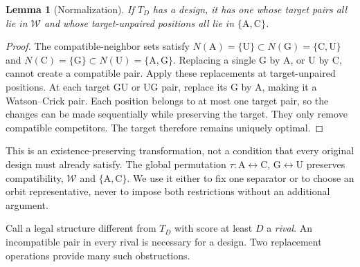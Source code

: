 \documentclass[11pt,a4paper]{article}
\newtheorem{lemma}[theorem]{Lemma}
\theoremstyle{definition}
\newcommand{\AC}{\{\mathrm A,\mathrm C\}}
\newcommand{\WC}{\mathcal W}
\begin{document}
\begin{lemma}[Normalization]\label{lem:normal}
If $T_D$ has a design, it has one whose target pairs all lie in $\WC$
and whose target-unpaired positions all lie in $\AC$.
\end{lemma}
\begin{proof}
The compatible-neighbor sets satisfy
$N(\mathrm A)=\{\mathrm U\}\subset N(\mathrm G)=\{\mathrm C,\mathrm U\}$
and
$N(\mathrm C)=\{\mathrm G\}\subset N(\mathrm U)=\{\mathrm A,\mathrm G\}$.
Replacing a single G by A, or U by C, cannot create a compatible pair.
Apply these replacements at target-unpaired positions. At each target
GU or UG pair, replace its G by A, making it a Watson--Crick pair.
Each position belongs to at most one target pair, so the changes can be
made sequentially while preserving the target. They only remove
compatible competitors. The target therefore remains uniquely optimal.
\end{proof}
This is an existence-preserving transformation, not a condition that
every original design must already satisfy. The global permutation
$\tau:\mathrm A\leftrightarrow\mathrm C$, $\mathrm G\leftrightarrow\mathrm U$
preserves compatibility, $\WC$ and $\AC$. We use it either to fix one
separator or to choose an orbit representative, never to impose both
restrictions without an additional argument.

Call a legal structure different from $T_D$ with score at least $D$
a \emph{rival}. An incompatible pair in every rival is necessary for a
design. Two replacement operations provide many such obstructions.
\end{document}
